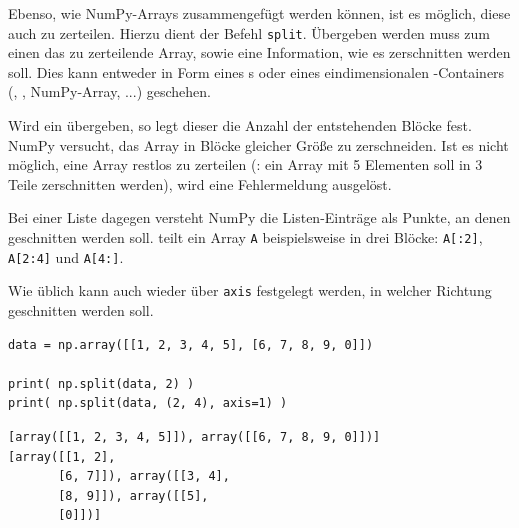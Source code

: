 Ebenso, wie NumPy-Arrays zusammengefügt werden können, ist es möglich, diese auch zu zerteilen. Hierzu dient der Befehl \texttt{split}. Übergeben werden muss zum einen das zu zerteilende Array, sowie eine Information, wie es zerschnitten werden soll. Dies kann entweder in Form eines s oder eines eindimensionalen -Containers (, , NumPy-Array, ...) geschehen.

Wird ein  übergeben, so legt dieser die Anzahl der entstehenden Blöcke fest. NumPy versucht, das Array in Blöcke gleicher Größe zu zerschneiden. Ist es nicht möglich, eine Array restlos zu zerteilen (\eg: ein Array mit 5 Elementen soll in 3 Teile zerschnitten werden), wird eine Fehlermeldung ausgelöst.

Bei einer Liste dagegen versteht NumPy die Listen-Einträge als Punkte, an denen geschnitten werden soll. \inPy{[2, 4]} teilt ein Array \texttt{A} beispielsweise in drei Blöcke: \texttt{A[:2]}, \texttt{A[2:4]} und \texttt{A[4:]}.

Wie üblich kann auch wieder über \texttt{axis} festgelegt werden, in welcher Richtung geschnitten werden soll.

\begin{codebox}
\begin{verbatim}
data = np.array([[1, 2, 3, 4, 5], [6, 7, 8, 9, 0]])

print( np.split(data, 2) )
print( np.split(data, (2, 4), axis=1) )
\end{verbatim}
\end{codebox}

\begin{cmdbox}
\begin{verbatim}
[array([[1, 2, 3, 4, 5]]), array([[6, 7, 8, 9, 0]])]
[array([[1, 2],
       [6, 7]]), array([[3, 4],
       [8, 9]]), array([[5],
       [0]])]
\end{verbatim}
\end{cmdbox}

